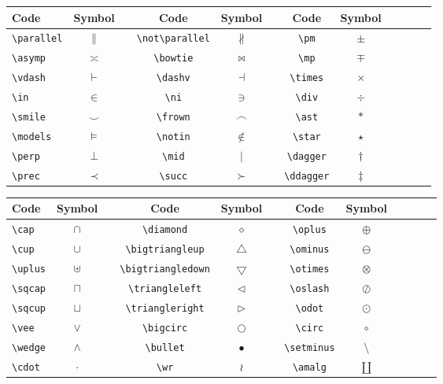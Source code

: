 \documentclass{article}
\begin{document}
\vspace{5mm}

\begin{tabular}{l*{10}{c}r}
	Code & Symbol & \vline & Code & Symbol & \vline & Code & Symbol \\
	\hline
	\verb|\parallel| & $\parallel$ & \vline & \verb|\not\parallel| & $\not\parallel$ & \vline & \verb|\pm| & $\pm$ \\
	\verb|\asymp| & $\asymp$ & \vline & \verb|\bowtie| & $\bowtie$ & \vline & \verb|\mp| & $\mp$ \\
	\verb|\vdash| & $\vdash$ & \vline & \verb|\dashv| & $\dashv$ & \vline & \verb|\times| & $\times$ \\
	\verb|\in| & $\in$ & \vline & \verb|\ni| & $\ni$ & \vline & \verb|\div| & $\div$ \\
	\verb|\smile| & $\smile$ & \vline & \verb|\frown| & $\frown$ & \vline & \verb|\ast| & $\ast$ \\
	\verb|\models| & $\models$ & \vline & \verb|\notin| & $\notin$ & \vline & \verb|\star| & $\star$ \\
	\verb|\perp| & $\perp$ & \vline & \verb|\mid| & $\mid$ & \vline & \verb|\dagger| & $\dagger$ \\
	\verb|\prec| & $\prec$ & \vline & \verb|\succ| & $\succ$ & \vline & \verb|\ddagger| & $\ddagger$
\end{tabular}

\vspace{5mm}

\begin{tabular}{l*{10}{c}r}
	Code & Symbol & \vline & Code & Symbol & \vline & Code & Symbol \\
	\hline
	\verb|\cap| & $\cap$ & \vline & \verb|\diamond| & $\diamond$ & \vline & \verb|\oplus| & $\oplus$ \\
	\verb|\cup| & $\cup$ & \vline & \verb|\bigtriangleup| & $\bigtriangleup$ & \vline & \verb|\ominus| & $\ominus$ \\
	\verb|\uplus| & $\uplus$ & \vline & \verb|\bigtriangledown| & $\bigtriangledown$ & \vline & \verb|\otimes| & $\otimes$ \\
	\verb|\sqcap| & $\sqcap$ & \vline & \verb|\triangleleft| & $\triangleleft$ & \vline & \verb|\oslash| & $\oslash$ \\
	\verb|\sqcup| & $\sqcup$ & \vline & \verb|\triangleright| & $\triangleright$ & \vline & \verb|\odot| & $\odot$ \\
	\verb|\vee| & $\vee$ & \vline & \verb|\bigcirc| & $\bigcirc$ & \vline & \verb|\circ| & $\circ$ \\
	\verb|\wedge| & $\wedge$ & \vline & \verb|\bullet| & $\bullet$ & \vline & \verb|\setminus| & $\setminus$ \\
	\verb|\cdot| & $\cdot$ & \vline & \verb|\wr| & $\wr$ & \vline & \verb|\amalg| & $\amalg$
\end{tabular}
\end{document}
